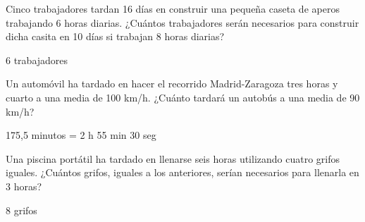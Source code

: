\documentclass[addpoints,spanish, 12pt,a4paper]{exam}
\begin{document}
\begin{questions}

\question[3] Cinco trabajadores tardan 16 días en construir una pequeña caseta de aperos  trabajando  6  horas  diarias.  ¿Cuántos  trabajadores  serán necesarios para construir dicha casita en 10 días si trabajan 8 horas diarias?
\begin{solution}
6 trabajadores
\end{solution}
\question [3] Un automóvil ha tardado en hacer el recorrido Madrid-Zaragoza tres horas y cuarto a una media de 100 km/h. ¿Cuánto tardará un autobús a una media de 90 km/h?
\begin{solution}
175,5 minutos = 2 h 55 min 30 seg 
\end{solution}

\question [3] Una  piscina  portátil  ha  tardado  en  llenarse  seis  horas  utilizando cuatro  grifos iguales. ¿Cuántos grifos, iguales a los anteriores, serían necesarios para llenarla en 3 horas?
\begin{solution}
8 grifos 
\end{solution}



\end{questions}
\end{document}
